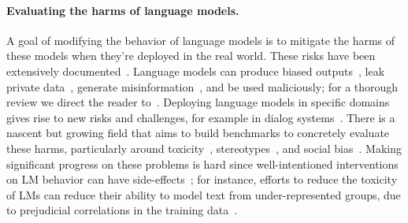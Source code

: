 \documentclass{article}
\begin{document}
\paragraph{Evaluating the harms of language models.} A goal of modifying the behavior of language models is to mitigate the harms of these models when they're deployed in the real world. These risks have been extensively documented~\citep{bender2021dangers,bommasani2021opportunities,kenton2021alignment,weidinger2021ethical,tamkin2021understanding}. Language models can produce biased outputs~\citep{dhamala2021bold,liang2021towards,manela2021stereotype,caliskan2017semantics,kirk2021true}, leak private data~\citep{carlini2021extracting}, generate misinformation~\citep{solaiman2019release,buchanan2021truth}, and be used maliciously; for a thorough review we direct the reader to~\citet{weidinger2021ethical}. Deploying language models in specific domains gives rise to new risks and challenges, for example in dialog systems~\citep{henderson2018ethical,xu2020recipes,dinan2019build}. There is a nascent but growing field that aims to build benchmarks to concretely evaluate these harms, particularly around toxicity~\citep{gehman2020realtoxicityprompts}, stereotypes~\citep{nadeem2020stereoset}, and social bias~\citep{dhamala2021bold,nangia2020crows,rudinger2018gender}. Making significant progress on these problems is hard since well-intentioned interventions on LM behavior can have side-effects~\citep{welbl2021challenges,blodgett2020language}; for instance, efforts to reduce the toxicity of LMs can reduce their ability to model text from under-represented groups, due to prejudicial correlations in the training data~\citep{xu2021detoxifying}.
\end{document}

